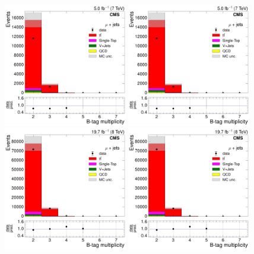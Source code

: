 \begin{figure}[H]
    \centering
      \includegraphics[width=0.48\textwidth]{Chapters/07_08_09_Analysis/Images/control_plots/before_fit/7TeV/MuPlusJets_N_BJets_with_ratio}\hfill
      \includegraphics[width=0.48\textwidth]{Chapters/07_08_09_Analysis/Images/control_plots/before_fit/7TeV/MuPlusJets_N_BJets_reweighted_with_ratio}\\
      \includegraphics[width=0.48\textwidth]{Chapters/07_08_09_Analysis/Images/control_plots/before_fit/8TeV/MuPlusJets_N_BJets_with_ratio}\hfill
      \includegraphics[width=0.48\textwidth]{Chapters/07_08_09_Analysis/Images/control_plots/before_fit/8TeV/MuPlusJets_N_BJets_reweighted_with_ratio}\\

\end{figure}
